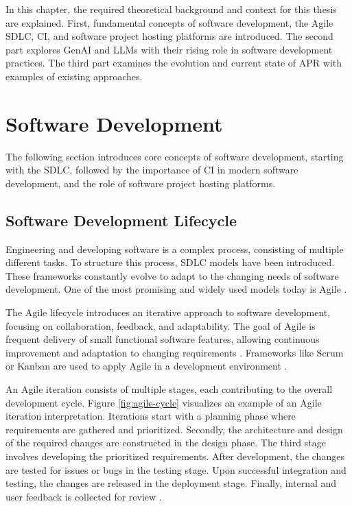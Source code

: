 In this chapter, the required theoretical background and context for this thesis are explained. First, fundamental concepts of software development, the Agile \ac{SDLC}, \ac{CI}, and software project hosting platforms are introduced. The second part explores \ac{GenAI} and \acp{LLM} with their rising role in software development practices. The third part examines the evolution and current state of \ac{APR} with examples of existing approaches.

\section{Software Development}

The following section introduces core concepts of software development, starting with the \ac{SDLC}, followed by the importance of \ac{CI} in modern software development, and the role of software project hosting platforms.

\subsection{Software Development Lifecycle}

Engineering and developing software is a complex process, consisting of multiple different tasks. To structure this process, \ac{SDLC} models have been introduced. These frameworks constantly evolve to adapt to the changing needs of software development. One of the most promising and widely used models today is Agile \cite{rupareliaSoftwareDevelopmentLifecycle2010, abrahamssonAgileSoftwareDevelopment2017}.

The Agile lifecycle introduces an iterative approach to software development, focusing on collaboration, feedback, and adaptability. The goal of Agile is frequent delivery of small functional software features, allowing continuous improvement and adaptation to changing requirements \cite{rupareliaSoftwareDevelopmentLifecycle2010, abrahamssonAgileSoftwareDevelopment2017}. Frameworks like Scrum or Kanban are used to apply Agile in a development environment \cite{zayatFrameworkStudyAgile2020}.

An Agile iteration consists of multiple stages, each contributing to the overall development cycle. Figure \ref{fig:agile-cycle} visualizes an example of an Agile iteration interpretation. Iterations start with a planning phase where requirements are gathered and prioritized. Secondly, the architecture and design of the required changes are constructed in the design phase. The third stage involves developing the prioritized requirements. After development, the changes are tested for issues or bugs in the testing stage. Upon successful integration and testing, the changes are released in the deployment stage. Finally, internal and user feedback is collected for review \cite{huoSoftwareQualityAgile2004}.

